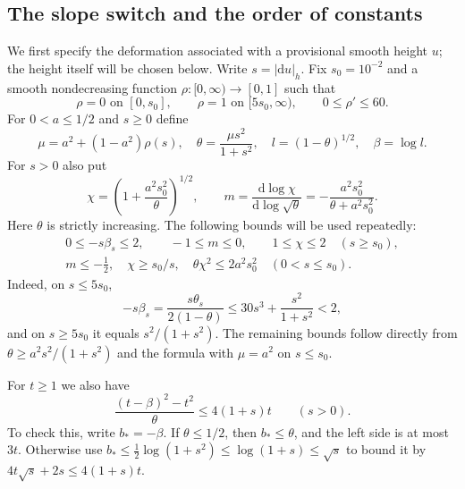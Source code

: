 \documentclass[11pt]{article}
\numberwithin{equation}{section}
\theoremstyle{definition}
\theoremstyle{remark}
\begin{document}
\subsection{The slope switch and the order of constants}

We first specify the deformation associated with a provisional smooth
height $u$; the height itself will be chosen below. Write $s=|\mathrm d u|_h$.
Fix $s_0=10^{-2}$ and a smooth nondecreasing function $\rho:[0,\infty)
\to[0,1]$ such that
\[
 \rho=0\text{ on }[0,s_0],\qquad
 \rho=1\text{ on }[5s_0,\infty),\qquad 0\le\rho'\le60.
\]
For $0<a\le1/2$ and $s\ge0$ define
\begin{equation}\label{step:switch}
 \mu=a^2+(1-a^2)\rho(s),\quad
 \theta=\frac{\mu s^2}{1+s^2},\quad
 l=(1-\theta)^{1/2},\quad \beta=\log l.
\end{equation}
For $s>0$ also put
\begin{equation}\label{step:chi}
 \chi=\left(1+\frac{a^2s_0^2}{\theta}\right)^{1/2},\qquad
 m=\frac{\mathrm d\log\chi}{\mathrm d\log\sqrt\theta}
   =-\frac{a^2s_0^2}{\theta+a^2s_0^2}.
\end{equation}
Here $\theta$ is strictly increasing.  The following bounds will be used
repeatedly:
\begin{equation}\label{step:switch-bounds}
\begin{gathered}
 0\le -s\beta_s\le2,\qquad -1\le m\le0,\qquad
 1\le\chi\le2\quad(s\ge s_0),\\
 m\le-\tfrac12,\quad \chi\ge s_0/s,\quad
 \theta\chi^2\le2a^2s_0^2\quad(0<s\le s_0).
\end{gathered}
\end{equation}
Indeed, on $s\le5s_0$,
\[
 -s\beta_s=\frac{s\theta_s}{2(1-\theta)}
 \le30s^3+\frac{s^2}{1+s^2}<2,
\]
and on $s\ge5s_0$ it equals $s^2/(1+s^2)$.  The remaining bounds follow
directly from $\theta\ge a^2s^2/(1+s^2)$ and the formula with $\mu=a^2$
on $s\le s_0$.

For $t\ge1$ we also have
\begin{equation}\label{step:beta-budget}
 \frac{(t-\beta)^2-t^2}{\theta}\le4(1+s)t\qquad(s>0).
\end{equation}
To check this, write $b_*=-\beta$.  If $\theta\le1/2$, then
$b_*\le\theta$, and the left side is at most $3t$.  Otherwise use
$b_*\le\tfrac12\log(1+s^2)\le\log(1+s)\le\sqrt s$ to bound it by
$4t\sqrt s+2s\le4(1+s)t$.
\end{document}

